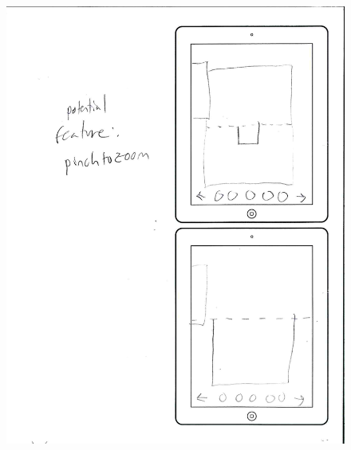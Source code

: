\begin{figure}[htbp]
\centering
\includegraphics{figures/90_Appendix_UI_Mockups/006.png}
\caption{}
\end{figure}

